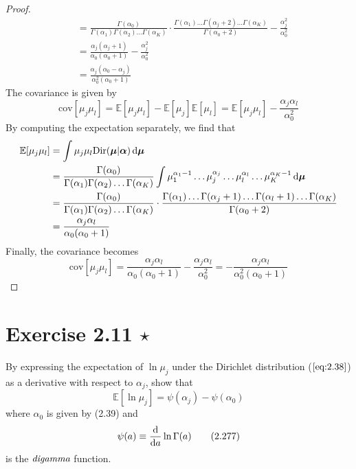 \begin{proof}
\begin{align*}
        &= \frac{\Gamma(\alpha_0)}{\Gamma(\alpha_1)\Gamma(\alpha_2)\ldots\Gamma(\alpha_K)}
        \cdot \frac{\Gamma(\alpha_1)\ldots\Gamma(\alpha_j + 2)\ldots\Gamma(\alpha_K)}
        {\Gamma(\alpha_0 + 2)} - \frac{\alpha_j^2}{\alpha_0^2} \\
        &= \frac{\alpha_j(\alpha_j + 1)}{\alpha_0(\alpha_0 + 1)} - \frac{\alpha_j^2}{\alpha_0^2} \\
        &= \frac{\alpha_j(\alpha_0 - \alpha_j)}{\alpha_0^2(\alpha_0 + 1)}
        \tag{2.275}
    \end{align*}
    The covariance is given by
    \[
    \text{cov}[\mu_j\mu_l] 
    = \mathbb{E}[\mu_j\mu_l] - \mathbb{E}[\mu_j]\mathbb{E}[\mu_l]
    = \mathbb{E}[\mu_j\mu_l] - \frac{\alpha_j\alpha_l}{\alpha_0^2}
    \] 
    By computing the expectation separately, we find that
    \begin{align*}
        \mathbb{E}[\mu_j\mu_l]
        &= \int \mu_j\mu_l \text{Dir}(\bm{\mu} | \bm{\alpha}) \mathop{}\!\mathrm{d} \bm{\mu} \\
        &= \frac{\Gamma(\alpha_0)}{\Gamma(\alpha_1)\Gamma(\alpha_2)\ldots\Gamma(\alpha_K)}
        \int \mu_1^{\alpha_1 - 1}\dots\mu_j^{\alpha_j}\ldots\mu_l^{\alpha_l}
        \ldots\mu_K^{\alpha_K - 1} \mathop{}\!\mathrm{d} \bm{\mu} \\
        &= \frac{\Gamma(\alpha_0)}{\Gamma(\alpha_1)\Gamma(\alpha_2)\ldots\Gamma(\alpha_K)}
        \cdot \frac{\Gamma(\alpha_1)\ldots\Gamma(\alpha_j + 1)\ldots\Gamma(\alpha_l + 1)\ldots
        \Gamma(\alpha_K)}{\Gamma(\alpha_0 + 2)}\\
        &= \frac{\alpha_j\alpha_l}{\alpha_0(\alpha_0 + 1)}
    \end{align*}
    Finally, the covariance becomes
    \[
        \text{cov}[\mu_j\mu_l] 
        = \frac{\alpha_j\alpha_l}{\alpha_0(\alpha_0 + 1)} - \frac{\alpha_j\alpha_l}{\alpha_0^2}
        = -\frac{\alpha_j\alpha_l}{\alpha_0^2(\alpha_0 + 1)}
        \tag{2.275}
    \] 
\end{proof}

\section*{Exercise 2.11 $\star$}
By expressing the expectation of $\ln \mu_j$ under the Dirichlet
distribution ($\ref{eq:2.38}$) as a derivative with respect
to $\alpha_j$, show that
\begin{equation*}
    \mathbb{E}[\ln \mu_j] = \psi(\alpha_j) - \psi(\alpha_0)
    \tag{2.276}\label{eq:2.276}
\end{equation*}
where $\alpha_0$ is given by (2.39) and
\begin{equation*}
    \psi(a) \equiv \dv{a} \ln \Gamma(a)
    \tag{2.277}\label{eq:2.277}
\end{equation*}
is the $\emph{digamma}$ function.

